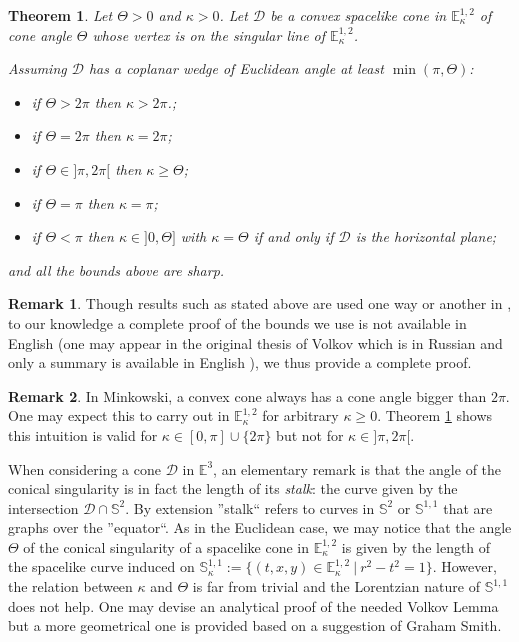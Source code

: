 \documentclass[a4paper,12pt]{article}
\def\D{\mathcal{D}}
\def\E{\mathbf E}
\def\D{\mathcal{D}}
\def\E{\mathbb{E}}
\newcommand{\mass}[1]{{\mathbb E}^{1,2}_{#1}}
\def\SS{\mathbb{S}}
\def\Cone{\mathcal D}
\def\E{\mathbb{E}}
\def\D{\mathcal{D}}
\newtheorem{theo}{Theorem}	%
\theoremstyle{definition}
\newtheorem*{rem}{Remark}			 %
\begin{document}
				\begin{theo}\label{theo:volkov_lorentz} Let $\Theta>0$ and $\kappa>0$. Let $\Cone$ be a convex spacelike cone in $\mass{\kappa}$ of cone angle $\Theta$ whose vertex is on the singular line of $\mass{\kappa}$. 
					
					 Assuming $\Cone$ has a coplanar wedge of Euclidean angle at least $\min(\pi,\Theta)$:

					\begin{itemize}
					 \item if $\Theta> 2\pi$ then $\kappa > 2\pi$.;
					 \item if $\Theta = 2\pi$ then $\kappa = 2\pi
					 $;
					 \item if $\Theta\in ]\pi,2\pi[$ then $\kappa \geq \Theta$;
					 \item if $\Theta = \pi$ then $\kappa = \pi$;
					 \item if $\Theta<\pi$ then $\kappa\in ]0,\Theta]$ with $\kappa=\Theta$ if and only if $\Cone$ is the horizontal plane;
					\end{itemize}
					and all the bounds above are sharp.
					\end{theo}
                \begin{rem}\label{rem:though_results_stated_above}
                 Though results such as stated above are used one way or another in \cite{MR2127379,MR2410380,MR2453328,MR2469522,MR2813423,milka1996space}, to our knowledge a complete proof of the bounds we use is not available in English (one may appear in the original thesis of Volkov which is in Russian and only a summary is available in English \cite{MR3904042}), we thus provide a complete proof. 
                \end{rem}               

					
				\begin{rem}\label{rem:minkowski_convex_cone_always} In Minkowski, a convex cone always has a cone angle bigger than $2\pi$. One may expect this to carry out in $\mass{\kappa}$ for arbitrary $\kappa\geq0$. Theorem \ref{theo:volkov_lorentz} shows this intuition is valid for $\kappa \in [0,\pi]\cup\{2\pi\}$ but not for $\kappa\in ]\pi,2\pi[$.			 
				\end{rem}

                    When considering a cone $\mathcal D$ in $\E^3$, an elementary remark is that the angle of the conical singularity is in fact the length of its {\it stalk}: the curve given by the intersection $\D\cap \SS^2$. By extension ''stalk`` refers to curves in $\SS^{2}$ or $\SS^{1,1}$ that are graphs over the ''equator``. 
					As in the Euclidean case, we may notice that the angle $\Theta$ of the conical singularity of a spacelike cone in $\mass{\kappa}$ is given by the length of the spacelike curve induced on $\SS^{1,1}_\kappa:=\{(t,x,y) \in \mass{\kappa}~|~ r^2-t^2=1\}$. However, the relation between $\kappa$ and $\Theta$  is far from trivial and the Lorentzian nature of $\SS^{1,1}$ does not help. One may devise an analytical proof of the needed Volkov Lemma \cite{thesis} but a more geometrical one is provided based on a suggestion of Graham Smith. 
					
\end{document}
